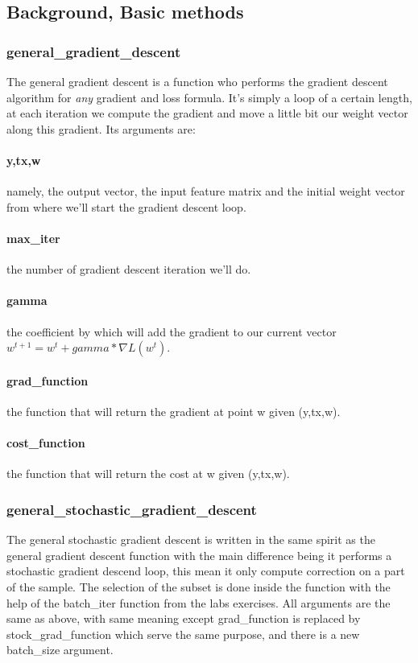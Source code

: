 \documentclass[10pt,conference,compsocconf]{IEEEtran}
\begin{document}
\subsection{Background, Basic methods}
\subsubsection{general\_gradient\_descent}
The general gradient descent is a function who performs the gradient descent algorithm for \emph{any} gradient and loss formula. It's simply a loop of a certain length, at each iteration we compute the gradient and move a little bit our weight vector along this gradient. Its arguments are:
\paragraph{y,tx,w} namely, the output vector, the input feature matrix and the initial weight vector from where we'll start the gradient descent loop.
\paragraph{max\_iter} the number of gradient descent iteration we'll do.
\paragraph{gamma} the coefficient by which will add the gradient to our current vector \(w^{t+1}=w^{t}+gamma*\nabla L(w^{t})\).
\paragraph{grad\_function} the function that will return the gradient at point w given (y,tx,w).
\paragraph{cost\_function} the function that will return the cost at w given (y,tx,w).


\subsubsection{general\_stochastic\_gradient\_descent}
The general stochastic gradient descent is written in the same spirit as the general gradient descent function with the main difference being it performs a stochastic gradient descend loop, this mean it only compute correction on a part of the sample. The selection of the subset is done inside the function with the help of the batch\_iter function from the labs exercises. All arguments are the same as above, with same meaning except grad\_function is replaced by stock\_grad\_function which serve the same purpose, and there is a new batch\_size argument.
\end{document}
